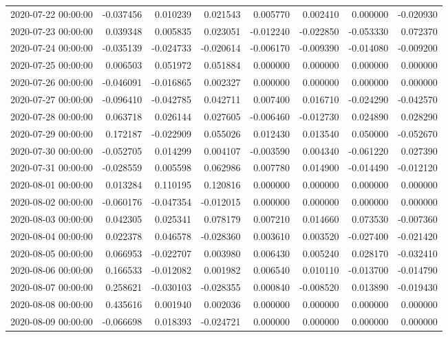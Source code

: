 \begin{tabular}{lrrrrrrr}
2020-07-22 00:00:00 & -0.037456 & 0.010239 & 0.021543 & 0.005770 & 0.002410 & 0.000000 & -0.020930 \\
2020-07-23 00:00:00 & 0.039348 & 0.005835 & 0.023051 & -0.012240 & -0.022850 & -0.053330 & 0.072370 \\
2020-07-24 00:00:00 & -0.035139 & -0.024733 & -0.020614 & -0.006170 & -0.009390 & -0.014080 & -0.009200 \\
2020-07-25 00:00:00 & 0.006503 & 0.051972 & 0.051884 & 0.000000 & 0.000000 & 0.000000 & 0.000000 \\
2020-07-26 00:00:00 & -0.046091 & -0.016865 & 0.002327 & 0.000000 & 0.000000 & 0.000000 & 0.000000 \\
2020-07-27 00:00:00 & -0.096410 & -0.042785 & 0.042711 & 0.007400 & 0.016710 & -0.024290 & -0.042570 \\
2020-07-28 00:00:00 & 0.063718 & 0.026144 & 0.027605 & -0.006460 & -0.012730 & 0.024890 & 0.028290 \\
2020-07-29 00:00:00 & 0.172187 & -0.022909 & 0.055026 & 0.012430 & 0.013540 & 0.050000 & -0.052670 \\
2020-07-30 00:00:00 & -0.052705 & 0.014299 & 0.004107 & -0.003590 & 0.004340 & -0.061220 & 0.027390 \\
2020-07-31 00:00:00 & -0.028559 & 0.005598 & 0.062986 & 0.007780 & 0.014900 & -0.014490 & -0.012120 \\
2020-08-01 00:00:00 & 0.013284 & 0.110195 & 0.120816 & 0.000000 & 0.000000 & 0.000000 & 0.000000 \\
2020-08-02 00:00:00 & -0.060176 & -0.047354 & -0.012015 & 0.000000 & 0.000000 & 0.000000 & 0.000000 \\
2020-08-03 00:00:00 & 0.042305 & 0.025341 & 0.078179 & 0.007210 & 0.014660 & 0.073530 & -0.007360 \\
2020-08-04 00:00:00 & 0.022378 & 0.046578 & -0.028360 & 0.003610 & 0.003520 & -0.027400 & -0.021420 \\
2020-08-05 00:00:00 & 0.066953 & -0.022707 & 0.003980 & 0.006430 & 0.005240 & 0.028170 & -0.032410 \\
2020-08-06 00:00:00 & 0.166533 & -0.012082 & 0.001982 & 0.006540 & 0.010110 & -0.013700 & -0.014790 \\
2020-08-07 00:00:00 & 0.258621 & -0.030103 & -0.028355 & 0.000840 & -0.008520 & 0.013890 & -0.019430 \\
2020-08-08 00:00:00 & 0.435616 & 0.001940 & 0.002036 & 0.000000 & 0.000000 & 0.000000 & 0.000000 \\
2020-08-09 00:00:00 & -0.066698 & 0.018393 & -0.024721 & 0.000000 & 0.000000 & 0.000000 & 0.000000 \\

\end{tabular}
